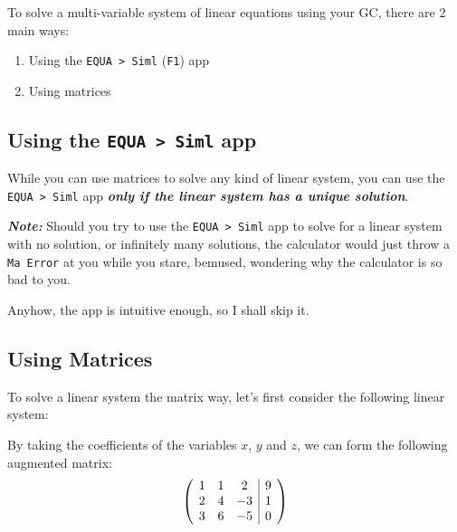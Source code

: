 \documentclass[a5paper]{memoir}
\makeatletter
\newenvironment{amatrix}[1]{%
		\left(\hspace{0.15cm}\begin{array}{@{}*{#1}{c}|c@{}}
		}{%
	\end{array}\hspace{0.15cm}\right)
	}
\def\code#1{\texttt{#1}}
\def\note#1{\textcolor[HTML]{109fa9}{\textbf{\textit{Note:}}} #1}
\def\Fone{(\code{F1}) }
\makeatother
\begin{document}
To solve a multi-variable system of linear equations using your GC, there are 2 main ways:
\begin{enumerate}
	\item Using the \code{EQUA > Siml} \Fone app
	\item Using matrices
\end{enumerate}

\subsection{Using the \code{EQUA > Siml} app}
While you can use matrices to solve any kind of linear system, you can use the \code{EQUA > Siml} app \textit{\textbf{only if the linear system has a unique solution}}.

\note{Should you try to use the \code{EQUA > Siml} app to solve for a linear system with no solution, or infinitely many solutions, the calculator would just throw a \code{Ma Error} at you while you stare, bemused, wondering why the calculator is so bad to you.}

Anyhow, the app is intuitive enough, so I shall skip it.

\subsection{Using Matrices} \label{sec:usingMatrices}

To solve a linear system the matrix way, let's first consider the following linear system:
\begin{center}
\end{center}

By taking the coefficients of the variables $x$, $y$ and $z$, we can form the following augmented matrix:
\[
	\begin{amatrix}{3}
		1 & 1 & 2  & 9 \\  
		2 & 4 & -3 & 1 \\
		3 & 6 & -5 & 0
	\end{amatrix}
\]
\end{document}
